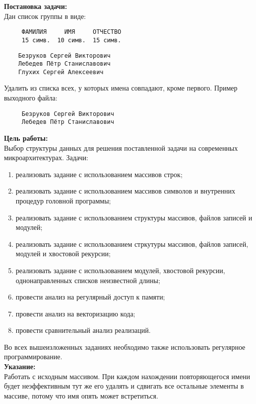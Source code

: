 \documentclass[a4paper,12pt]{article}
\begin{document}
\tableofcontents
\pagebreak

\begin{center}\end{center}
\textbf{Постановка задачи:}\\
Дан список группы в виде:
\begin{verbatim}
     ФАМИЛИЯ     ИМЯ     ОТЧЕСТВО
     15 симв.  10 симв.  15 симв.
\end{verbatim}
\begin{verbatim}
    Безруков Сергей Викторович
    Лебедев Пётр Станиславович
    Глухих Сергей Алексеевич
\end{verbatim}
Удалить из списка всех, у которых имена совпадают, кроме первого. Пример выходного файла:
\begin{verbatim}
     Безруков Сергей Викторович
     Лебедев Пётр Станиславович
\end{verbatim}
\textbf{Цель работы:}\\
Выбор структуры данных для решения поставленной задачи на современных микроархитектурах. 
Задачи:
\begin{enumerate}
	\item реализовать задание с использованием массивов строк;
	\item реализовать задание с использованием массивов символов и внутренних процедур головной программы;
	\item реализовать задание с использованием структуры массивов, файлов записей и модулей;
	\item реализовать задание с использованием стркутуры массивов, файлов записей, модулей и хвостовой рекурсии;
	\item реализовать задание с использованием модулей, хвостовой рекурсии, однонаправленных списков неизвестной длины;
	\item провести анализ на регулярный доступ к памяти;
	\item провести анализ на векторизацию кода;
	\item провести сравнительный анализ реализаций.
\end{enumerate}

Во всех вышеизложенных заданиях необходимо также использовать регулярное программирование.\\
\textbf{Указание:}\\
Работать с исходным массивом. При каждом нахождении повторяющегося имени будет неэффективным тут же его удалять и сдвигать все остальные элементы в массиве, потому что имя опять может встретиться.
\end{document}
